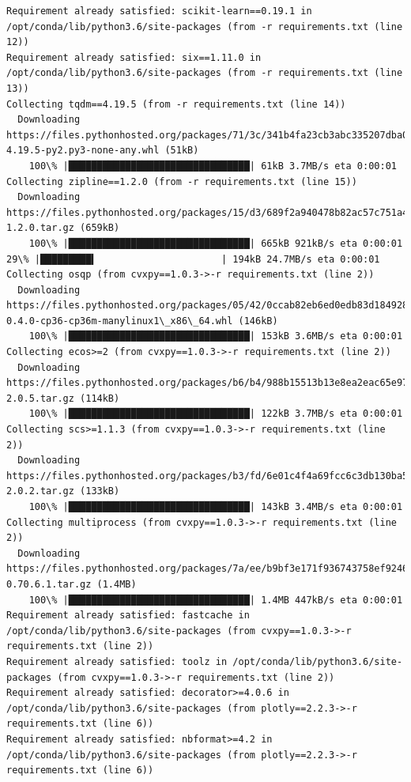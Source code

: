 \documentclass[11pt]{article}
\begin{document}
\begin{Verbatim}[commandchars=\\\{\}]
Requirement already satisfied: scikit-learn==0.19.1 in /opt/conda/lib/python3.6/site-packages (from -r requirements.txt (line 12))
Requirement already satisfied: six==1.11.0 in /opt/conda/lib/python3.6/site-packages (from -r requirements.txt (line 13))
Collecting tqdm==4.19.5 (from -r requirements.txt (line 14))
  Downloading https://files.pythonhosted.org/packages/71/3c/341b4fa23cb3abc335207dba057c790f3bb329f6757e1fcd5d347bcf8308/tqdm-4.19.5-py2.py3-none-any.whl (51kB)
    100\% |████████████████████████████████| 61kB 3.7MB/s eta 0:00:01
Collecting zipline==1.2.0 (from -r requirements.txt (line 15))
  Downloading https://files.pythonhosted.org/packages/15/d3/689f2a940478b82ac57c751a40460598221fd82b0449a7a8f7eef47a3bcc/zipline-1.2.0.tar.gz (659kB)
    100\% |████████████████████████████████| 665kB 921kB/s eta 0:00:01    29\% |█████████▍                      | 194kB 24.7MB/s eta 0:00:01
Collecting osqp (from cvxpy==1.0.3->-r requirements.txt (line 2))
  Downloading https://files.pythonhosted.org/packages/05/42/0ccab82eb6ed0edb83d184928ec864232dc00c3cf968a4b92a02caf0f7ec/osqp-0.4.0-cp36-cp36m-manylinux1\_x86\_64.whl (146kB)
    100\% |████████████████████████████████| 153kB 3.6MB/s eta 0:00:01
Collecting ecos>=2 (from cvxpy==1.0.3->-r requirements.txt (line 2))
  Downloading https://files.pythonhosted.org/packages/b6/b4/988b15513b13e8ea2eac65e97d84221ac515a735a93f046e2a2a3d7863fc/ecos-2.0.5.tar.gz (114kB)
    100\% |████████████████████████████████| 122kB 3.7MB/s eta 0:00:01
Collecting scs>=1.1.3 (from cvxpy==1.0.3->-r requirements.txt (line 2))
  Downloading https://files.pythonhosted.org/packages/b3/fd/6e01c4f4a69fcc6c3db130ba55572089e78e77ea8c0921a679f9da1ec04c/scs-2.0.2.tar.gz (133kB)
    100\% |████████████████████████████████| 143kB 3.4MB/s eta 0:00:01
Collecting multiprocess (from cvxpy==1.0.3->-r requirements.txt (line 2))
  Downloading https://files.pythonhosted.org/packages/7a/ee/b9bf3e171f936743758ef924622d8dd00516c5532b00a1210a09bce68325/multiprocess-0.70.6.1.tar.gz (1.4MB)
    100\% |████████████████████████████████| 1.4MB 447kB/s eta 0:00:01
Requirement already satisfied: fastcache in /opt/conda/lib/python3.6/site-packages (from cvxpy==1.0.3->-r requirements.txt (line 2))
Requirement already satisfied: toolz in /opt/conda/lib/python3.6/site-packages (from cvxpy==1.0.3->-r requirements.txt (line 2))
Requirement already satisfied: decorator>=4.0.6 in /opt/conda/lib/python3.6/site-packages (from plotly==2.2.3->-r requirements.txt (line 6))
Requirement already satisfied: nbformat>=4.2 in /opt/conda/lib/python3.6/site-packages (from plotly==2.2.3->-r requirements.txt (line 6))

\end{Verbatim}
\end{document}
